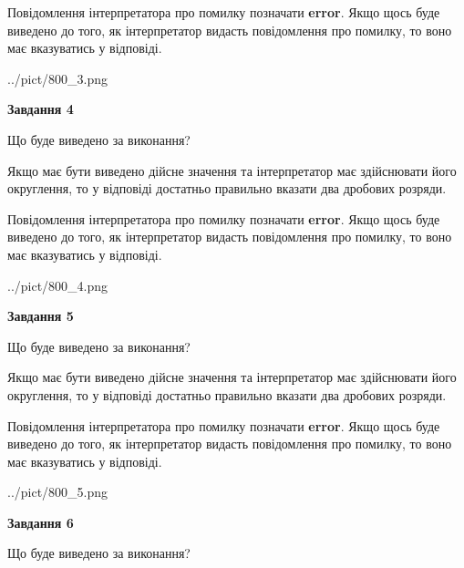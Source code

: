 \documentclass[12pt, ukrainian]{article}
\begin{document}
{\begin {Large}
Повідомлення інтерпретатора про помилку позначати \textbf{error}.
Якщо щось буде виведено до того, як інтерпретатор видасть повідомлення про помилку, 
то воно має вказуватись у відповіді. \par

\begin{center}
	{../pict/800_3.png}
\end{center}
\newpage

{\begin {center}\textbf{Завдання 4}\end {center}}\par
Що буде виведено за виконання? \par

Якщо має бути виведено дійсне значення та інтерпретатор має здійснювати його округлення, 
то у відповіді достатньо правильно вказати два дробових розряди.

Повідомлення інтерпретатора про помилку позначати \textbf{error}.
Якщо щось буде виведено до того, як інтерпретатор видасть повідомлення про помилку, 
то воно має вказуватись у відповіді. \par

\begin{center}
	{../pict/800_4.png}
\end{center}
\newpage

{\begin {center}\textbf{Завдання 5}\end {center}}\par
Що буде виведено за виконання? \par

Якщо має бути виведено дійсне значення та інтерпретатор має здійснювати його округлення, 
то у відповіді достатньо правильно вказати два дробових розряди.

Повідомлення інтерпретатора про помилку позначати \textbf{error}.
Якщо щось буде виведено до того, як інтерпретатор видасть повідомлення про помилку, 
то воно має вказуватись у відповіді. \par

\begin{center}
	{../pict/800_5.png}
\end{center}
\newpage

{\begin {center}\textbf{Завдання 6}\end {center}}\par
Що буде виведено за виконання? \par


\end{Large}}
\end{document}
